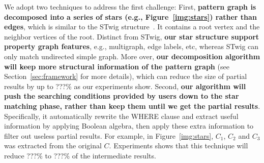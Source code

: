 We adopt two techniques to address the first challenge:
First, \textbf{pattern graph is decomposed into a series of stars (e.g., Figure~\ref{img:stars}) rather than edges},
which is similar to the STwig structure~\cite{DBLP:journals/pvldb/SunWWSL12}.
It contains a root vertex and the neighbor vertices of the root.
Distinct from STwig, \textbf{our star structure support property graph features}, e.g., multigraph, edge labels, etc,
whereas STwig can only match undirected simple graph.
More over, \textbf{our decomposition algorithm will keep more structural information of the pattern graph} (see Section~\ref{sec:framework} for more details),
which can reduce the size of partial results by up to \@???\% as our experiments show.
Second, \textbf{our algorithm will push the searching conditions provided by users down to the star matching phase,
rather than keep them until we get the partial results}.
Specifically, it automatically rewrite the WHERE clause and extract useful information by applying Boolean algebra,
then apply these extra information to filter out useless partial results.
For example, in Figure~\ref{img:stars}, $C_1$, $C_2$ and $C_3$ was extracted from the original $C$.
Experiments shows that this technique will reduce \@???\% to \@???\% of the intermediate results.
